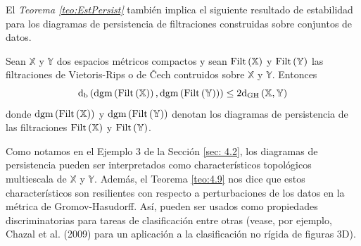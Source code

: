 El \emph{Teorema \ref{teo:EstPersist}} tambi\'en implica el siguiente resultado
de estabilidad para los diagramas de persistencia de filtraciones construidas sobre
conjuntos de datos.

\begin{teorema}\label{teo:4.9}
    Sean $\mathbb{X}$ y $\mathbb{Y}$ dos espacios m\'etricos compactos y sean
    $\mathrm{Filt}\left(\mathbb{X}\right)$ y $\mathrm{Filt}\left(\mathbb{Y}\right)$ las
    filtraciones de Vietoris-Rips o de \v Cech contruidos sobre $\mathbb{X}$ y
    $\mathbb{Y}$. Entonces
    \begin{equation*}
        \mathrm{d}_{\mathrm{b}}
        \left(\mathrm{dgm}\left(\mathrm{Filt}\left(\mathbb{X}\right)\right),
        \mathrm{dgm}\left(\mathrm{Filt}\left(\mathbb{Y}\right)\right)\right)\leq
        2\mathrm{d}_{\mathrm{GH}}\left(\mathbb{X},\mathbb{Y}\right)
    \end{equation*}
    donde $\mathrm{dgm}\left(\mathrm{Filt}\left(\mathbb{X}\right)\right)$ y
    $\mathrm{dgm}\left(\mathrm{Filt}\left(\mathbb{Y}\right)\right)$ denotan los
    diagramas de persistencia de las filtraciones $\mathrm{Filt}\left(\mathbb{X}\right)$ y
    $\mathrm{Filt}\left(\mathbb{Y}\right)$.
\end{teorema}

Como notamos en el Ejemplo 3 de la Secci\'on \ref{sec: 4.2}, los diagramas de persistencia pueden
ser interpretados como character\'isticos topol\'ogicos multiescala de 
$\mathbb{X}$ y $\mathbb{Y}$. Adem\'as, el Teorema \ref{teo:4.9} nos dice que estos
character\'isticos son resilientes con respecto a perturbaciones de los datos en la
m\'etrica de Gromov-Hasudorff. As\'i, pueden ser usados como propiedades discriminatorias
para tareas de clasificaci\'on entre otras (vease, por ejemplo, Chazal et al. (2009)\cite{chazal2009b}
para un aplicaci\'on a la clasificaci\'on no r\'igida de figuras 3D).